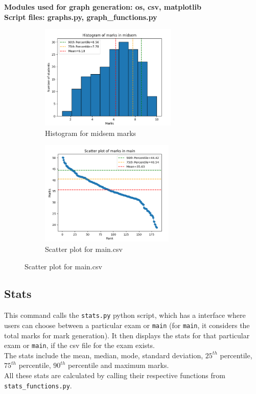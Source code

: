 \documentclass{article}
\begin{document}
\textbf{Modules used for graph generation: os, csv, matplotlib}\\

\textbf{Script files: graphs.py, graph\_functions.py}

\begin{figure}[h]
    \begin{subfigure}{0.5\textwidth}
    \includegraphics[width=\linewidth, height=5cm]{histogram.png} 
    \caption{Histogram for midsem marks}
    \end{subfigure}
    \begin{subfigure}{0.5\textwidth}
    \includegraphics[width=\linewidth, height=5cm]{scatter-plot.png}
    \caption{Scatter plot for main.csv}
    \end{subfigure}
\end{figure}
\newpage

\subsection{Stats}
This command calls the \verb"stats.py" python script, which has a interface where users can choose between a particular exam or \verb"main" (for \verb"main", it considers the total marks for mark generation). It then displays the stats for that particular exam or \verb"main", if the csv file for the exam exists.\\
The stats include the mean, median, mode, standard deviation, $25^{th}$ percentile, $75^{th}$ percentile, $90^{th}$ percentile and maximum marks.\\
All these stats are calculated by calling their respective functions from \verb"stats_functions.py".\\
\end{document}
